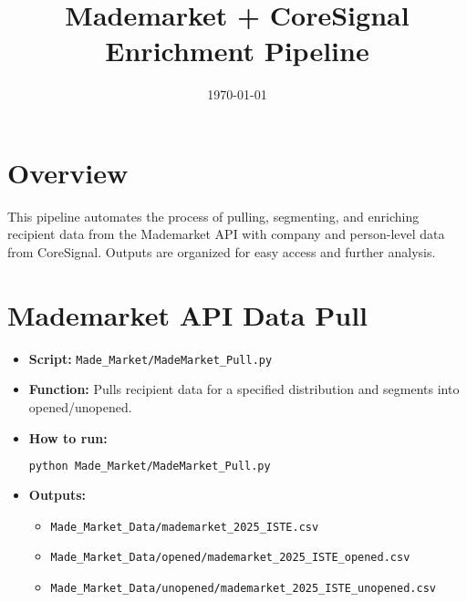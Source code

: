 \documentclass{article}
\title{Mademarket + CoreSignal Enrichment Pipeline}
\author{}
\date{\today}
\begin{document}
\maketitle

\section{Overview}
This pipeline automates the process of pulling, segmenting, and enriching recipient data from the Mademarket API with company and person-level data from CoreSignal. Outputs are organized for easy access and further analysis.

\section{Mademarket API Data Pull}
\begin{itemize}
  \item \textbf{Script:} \texttt{Made\_Market/MadeMarket\_Pull.py}
  \item \textbf{Function:} Pulls recipient data for a specified distribution and segments into opened/unopened.
  \item \textbf{How to run:}
\begin{lstlisting}[language=bash]
python Made_Market/MadeMarket_Pull.py
\end{lstlisting}
  \item \textbf{Outputs:}
  \begin{itemize}
    \item \texttt{Made\_Market\_Data/mademarket\_2025\_ISTE.csv}
    \item \texttt{Made\_Market\_Data/opened/mademarket\_2025\_ISTE\_opened.csv}
    \item \texttt{Made\_Market\_Data/unopened/mademarket\_2025\_ISTE\_unopened.csv}
  \end{itemize}
\end{itemize}
\end{document}
